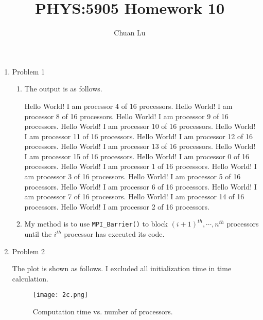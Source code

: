 \documentclass{article}
\begin{document}
\author{Chuan Lu}
\title{PHYS:5905 Homework 10}
\maketitle

\medskip

\begin{enumerate}

\item Problem 1

\begin{enumerate}

\item The output is as follows.

Hello World! I am processor 4 of 16 processors.
Hello World! I am processor 8 of 16 processors.
Hello World! I am processor 9 of 16 processors.
Hello World! I am processor 10 of 16 processors.
Hello World! I am processor 11 of 16 processors.
Hello World! I am processor 12 of 16 processors.
Hello World! I am processor 13 of 16 processors.
Hello World! I am processor 15 of 16 processors.
Hello World! I am processor 0 of 16 processors.
Hello World! I am processor 1 of 16 processors.
Hello World! I am processor 3 of 16 processors.
Hello World! I am processor 5 of 16 processors.
Hello World! I am processor 6 of 16 processors.
Hello World! I am processor 7 of 16 processors.
Hello World! I am processor 14 of 16 processors.
Hello World! I am processor 2 of 16 processors.

\item My method is to use \texttt{MPI\_Barrier()} to block $(i+1)^{th}, \cdots, n^{th} $ processors until the $i^{th} $ processor has executed its code.

\end{enumerate}

\item Problem 2

The plot is shown as follows. I excluded all initialization time in time calculation.

\begin{figure}
\centering
\texttt{[image: 2c.png]}
\caption{Computation time vs. number of processors.}
\label{1}
\end{figure}


\end{enumerate}
\end{document}
